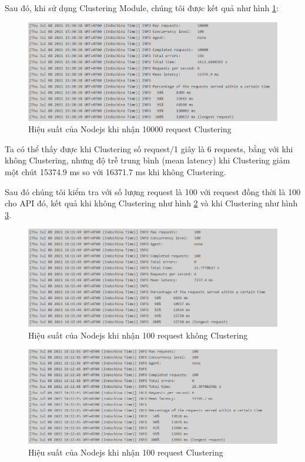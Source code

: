 Sau đó, khi sử dụng Clustering Module, chúng tôi được kết quả như hình \ref{fig:cluster10000}: 
\begin{figure}[H]
    \centering
    \includegraphics[width=\textwidth]{images/Khanh/Nodejs/WithCluster10000-100.PNG}
    \caption{Hiệu suất của Nodejs khi nhận 10000 request Clustering}
    \label{fig:cluster10000}
\end{figure}

Ta có thể thấy được khi Clustering số request/1 giây là 6 requests, bằng với khi không Clustering, nhưng độ trễ trung bình (mean latency) khi Clustering giảm một chút 15374.9 ms so với 16371.7 ms khi không Clustering.

Sau đó chúng tôi kiểm tra với số lượng request là 100 với request đồng thời là 100 cho API đó, kết quả khi không Clustering như hình \ref{fig:nocluster100} và khi Clustering như hình \ref{fig:cluster100}.

\begin{figure}[H]
    \centering
    \includegraphics[width=\textwidth]{images/Khanh/Nodejs/NoCluster100-100.PNG}
    \caption{Hiệu suất của Nodejs khi nhận 100 request không Clustering}
    \label{fig:nocluster100}
\end{figure}

\begin{figure}[H]
    \centering
    \includegraphics[width=\textwidth]{images/Khanh/Nodejs/WithCluster100-100.PNG}
    \caption{Hiệu suất của Nodejs khi nhận 100 request Clustering}
    \label{fig:cluster100}
\end{figure}

